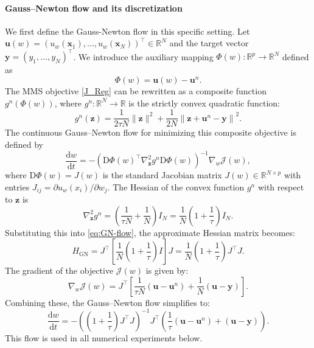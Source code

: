 \documentclass[twoside,11pt]{article}
\newcommand{\x}{{\bm x}}
\begin{document}
\paragraph{Gauss--Newton flow and its discretization} We first define the  Gauss-Newton flow in this specific setting.  Let $\mathbf{u}(w) = (u_{w}(\x_1), \dots, u_{w}(\x_N))^\top \in \mathbb{R}^{N}$  and the target vector $\mathbf{y} = (y_1, \dots, y_N)^\top$.
We introduce the auxiliary mapping $\Phi(w): \mathbb{R}^p \rightarrow \mathbb{R}^N$ defined as
\begin{equation}
 \Phi(w) =  \mathbf{u}(w) - \mathbf{u}^n .
\end{equation}
The MMS objective \eqref{J_Reg} can be rewritten as a composite function $g^n(\Phi(w))$, where $g^n: \mathbb{R}^N \to \mathbb{R}$ is the strictly convex quadratic function:
\begin{equation}\label{def_g}
  g^n (\mathbf{z}) = \frac{1}{2 \tau  N}  \| \mathbf{z} \|^2 + \frac{1}{2 N} \left \|   \mathbf{z}  + \mathbf{u}^n - \mathbf{y}  \right \|^2.
\end{equation}
The continuous Gauss--Newton flow for minimizing this composite objective is defined by
\begin{equation}\label{eq:GN-flow}
    \frac{\mathrm{d}w}{\mathrm{d}t}
    =
    - \left(
        \mathrm{D}\Phi(w)^{\!\top} \nabla^2_{\mathbf{z}} g^n
        \mathrm{D}\Phi(w)
    \right)^{-1} \nabla_{w} \mathcal{J}(w),
\end{equation}
where $\mathrm{D}\Phi(w) = J(w)$ is the standard Jacobian matrix $J(w) \in \mathbb{R}^{N \times p}$ with entries $J_{ij} = \partial u_{w}(x_i) / \partial w_j$. The Hessian of the convex function $g^n$ with respect to $\mathbf{z}$ is
\begin{equation}
\nabla^2_{\mathbf{z}} g^n =  \left( \frac{1}{\tau  N} + \frac{1}{ N} \right) I_N = \frac{1}{ N} \left(1 + \frac{1}{\tau} \right) I_N.
\end{equation}
Substituting this into \eqref{eq:GN-flow}, the approximate Hessian matrix becomes:
\begin{equation}
    H_{\text{GN}} = J^\top \left[ \frac{1}{ N} \left(1 + \frac{1}{\tau} \right) I \right] J
    = \frac{1}{N} \left(1 + \frac{1}{\tau} \right) J^\top J.
\end{equation}
The gradient of the objective $\mathcal{J}(w)$ is given by:
\begin{equation}
    \nabla_w \mathcal{J}(w) = J^\top \left[ \frac{1}{\tau N}(\mathbf{u} - \mathbf{u}^n) + \frac{1}{N}(\mathbf{u} - \mathbf{y}) \right].
\end{equation}
Combining these, the Gauss--Newton flow simplifies to:
\begin{equation}\label{GN_for_u_final}
    \frac{\mathrm{d}w}{\mathrm{d}t}
    = - \left( \left(1 + \frac{1}{\tau} \right) J^\top J \right)^{-1} J^\top \left( \frac{1}{\tau}(\mathbf{u} - \mathbf{u}^n) + (\mathbf{u} - \mathbf{y}) \right).
\end{equation}
This flow is used in all numerical experiments below.
\end{document}

